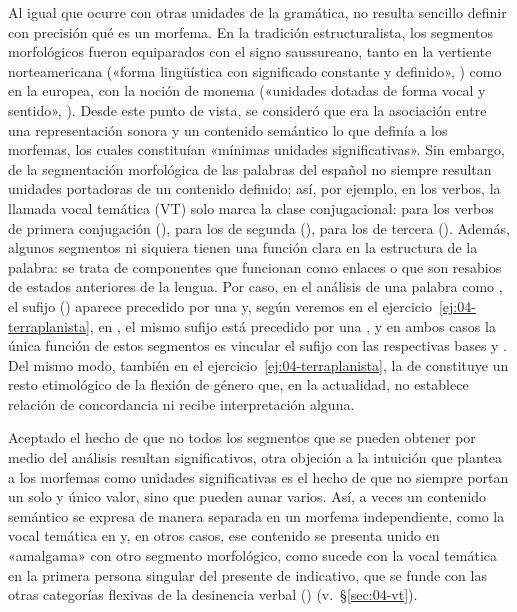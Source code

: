 Al igual que ocurre con otras unidades de la gramática, no resulta sencillo
definir con precisión qué es un morfema. En la tradición estructuralista, los
segmentos morfológicos fueron equiparados con el signo saussureano, tanto en la
vertiente norteamericana («forma lingüística con significado constante y
definido», \cite{bloomfield1933}) como en la europea, con la noción de monema
(«unidades dotadas de forma vocal y sentido», \cite{martinet1949}). Desde este
punto de vista, se consideró que era la asociación entre una representación
sonora y un contenido semántico lo que definía a los morfemas, los cuales
constituían «mínimas unidades significativas». Sin embargo, de la segmentación
morfológica de las palabras del español no siempre resultan unidades portadoras
de un contenido definido; así, por ejemplo, en los verbos, la llamada vocal
temática (VT) solo marca la clase conjugacional:  para los verbos de
primera conjugación (),  para los de segunda
(),  para los de tercera (). Además,
algunos segmentos ni siquiera tienen una función clara en la estructura de la
palabra: se trata de componentes que funcionan como enlaces o que son resabios
de estados anteriores de la lengua. Por caso, en el análisis de una palabra como
, el sufijo  ()
aparece precedido por una  y, según veremos en el
ejercicio~\ref{ej:04-terraplanista}, en , el mismo sufijo
está precedido por una , y en ambos casos la única función de estos
segmentos es vincular el sufijo  con las respectivas bases
 y . Del mismo modo, también en el
ejercicio~\ref{ej:04-terraplanista}, la  de 
constituye un resto etimológico de la flexión de género que, en la actualidad,
no establece relación de concordancia ni recibe interpretación alguna.

Aceptado el hecho de que no todos los segmentos que se pueden obtener por medio
del análisis resultan significativos, otra objeción a la intuición que plantea a
los morfemas como unidades significativas es el hecho de que no siempre portan
un solo y único valor, sino que pueden aunar varios. Así, a veces un contenido
semántico se expresa de manera separada en un morfema independiente, como la
vocal temática en  y, en otros casos, ese contenido se presenta
unido en «amalgama» con otro segmento morfológico, como sucede con la vocal
temática en la primera persona singular del presente de indicativo, que se funde
con las otras categorías flexivas de la desinencia verbal () (v.~§\ref{sec:04-vt}).

